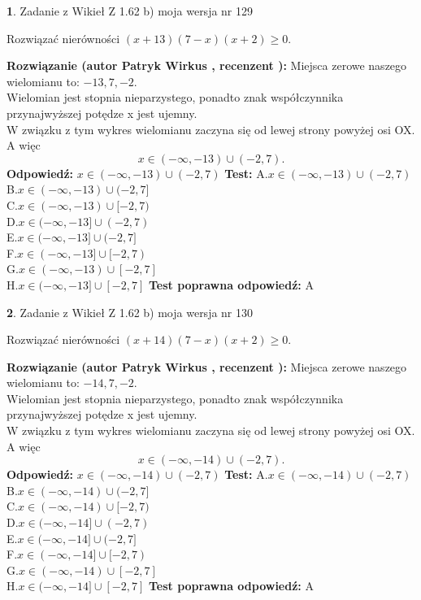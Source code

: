 \documentclass[12pt, a4paper]{article}
\theoremstyle{definition} %
\newtheorem{zad}{}
\newcommand{\zadStart}[1]{\begin{zad}#1\newline}
\newcommand{\zadStop}{\end{zad}}
\newcommand{\rozwStart}[2]{\noindent \textbf{Rozwiązanie (autor #1 , recenzent #2): }\newline}
\newcommand{\rozwStop}{\newline}
\newcommand{\odpStart}{\noindent \textbf{Odpowiedź:}\newline}
\newcommand{\odpStop}{\newline}
\newcommand{\testStart}{\noindent \textbf{Test:}\newline}
\newcommand{\testStop}{\newline}
\newcommand{\kluczStart}{\noindent \textbf{Test poprawna odpowiedź:}\newline}
\newcommand{\kluczStop}{\newline}
\begin{document}
\zadStart{Zadanie z Wikieł Z 1.62 b) moja wersja nr 129}

Rozwiązać nierówności $(x+13)(7-x)(x+2)\ge0$.
\zadStop
\rozwStart{Patryk Wirkus}{}
Miejsca zerowe naszego wielomianu to: $-13, 7, -2$.\\
Wielomian jest stopnia nieparzystego, ponadto znak współczynnika przy\linebreak najwyższej potędze x jest ujemny.\\ W związku z tym wykres wielomianu zaczyna się od lewej strony powyżej osi OX. A więc $$x \in (-\infty,-13) \cup (-2,7).$$
\rozwStop
\odpStart
$x \in (-\infty,-13) \cup (-2,7)$
\odpStop
\testStart
A.$x \in (-\infty,-13) \cup (-2,7)$\\
B.$x \in (-\infty,-13) \cup (-2,7]$\\
C.$x \in (-\infty,-13) \cup [-2,7)$\\
D.$x \in (-\infty,-13] \cup (-2,7)$\\
E.$x \in (-\infty,-13] \cup (-2,7]$\\
F.$x \in (-\infty,-13] \cup [-2,7)$\\
G.$x \in (-\infty,-13) \cup [-2,7]$\\
H.$x \in (-\infty,-13] \cup [-2,7]$
\testStop
\kluczStart
A
\kluczStop



\zadStart{Zadanie z Wikieł Z 1.62 b) moja wersja nr 130}

Rozwiązać nierówności $(x+14)(7-x)(x+2)\ge0$.
\zadStop
\rozwStart{Patryk Wirkus}{}
Miejsca zerowe naszego wielomianu to: $-14, 7, -2$.\\
Wielomian jest stopnia nieparzystego, ponadto znak współczynnika przy\linebreak najwyższej potędze x jest ujemny.\\ W związku z tym wykres wielomianu zaczyna się od lewej strony powyżej osi OX. A więc $$x \in (-\infty,-14) \cup (-2,7).$$
\rozwStop
\odpStart
$x \in (-\infty,-14) \cup (-2,7)$
\odpStop
\testStart
A.$x \in (-\infty,-14) \cup (-2,7)$\\
B.$x \in (-\infty,-14) \cup (-2,7]$\\
C.$x \in (-\infty,-14) \cup [-2,7)$\\
D.$x \in (-\infty,-14] \cup (-2,7)$\\
E.$x \in (-\infty,-14] \cup (-2,7]$\\
F.$x \in (-\infty,-14] \cup [-2,7)$\\
G.$x \in (-\infty,-14) \cup [-2,7]$\\
H.$x \in (-\infty,-14] \cup [-2,7]$
\testStop
\kluczStart
A
\kluczStop
\end{document}
